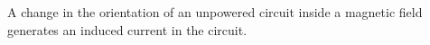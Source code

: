 A change in the orientation of an unpowered circuit 
inside a magnetic field generates an induced current
in the circuit.